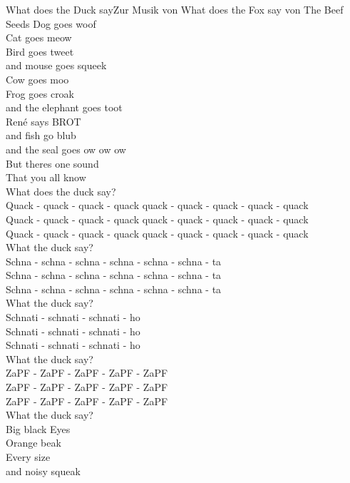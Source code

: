 
\begin{lied}{What does the Duck say}{Zur Musik von 
What does the Fox say von The Beef Seeds}
Dog goes woof\\
Cat goes meow\\
Bird goes tweet\\
and mouse goes squeek\\
Cow goes moo\\
Frog goes croak\\
and the elephant goes toot\\
René says BROT\\
and fish go blub\\
and the seal goes ow ow ow\\
But theres one sound\\
That you all know\\
What does the duck say?\\
Quack - quack - quack - quack quack - quack - quack - quack - quack\\
Quack - quack - quack - quack quack - quack - quack - quack - quack\\
Quack - quack - quack - quack quack - quack - quack - quack - quack\\
What the duck say?\\
Schna - schna - schna - schna - schna - schna - ta\\
Schna - schna - schna - schna - schna - schna - ta\\
Schna - schna - schna - schna - schna - schna - ta\\
What the duck say?\\
Schnati - schnati - schnati - ho\\
Schnati - schnati - schnati - ho\\
Schnati - schnati - schnati - ho\\
What the duck say?\\
ZaPF - ZaPF - ZaPF - ZaPF - ZaPF\\
ZaPF - ZaPF - ZaPF - ZaPF - ZaPF\\
ZaPF - ZaPF - ZaPF - ZaPF - ZaPF\\
What the duck say?\\
\vspace{1em}
Big black Eyes\\
Orange beak\\
Every size\\
and noisy squeak\\

\end{lied}
